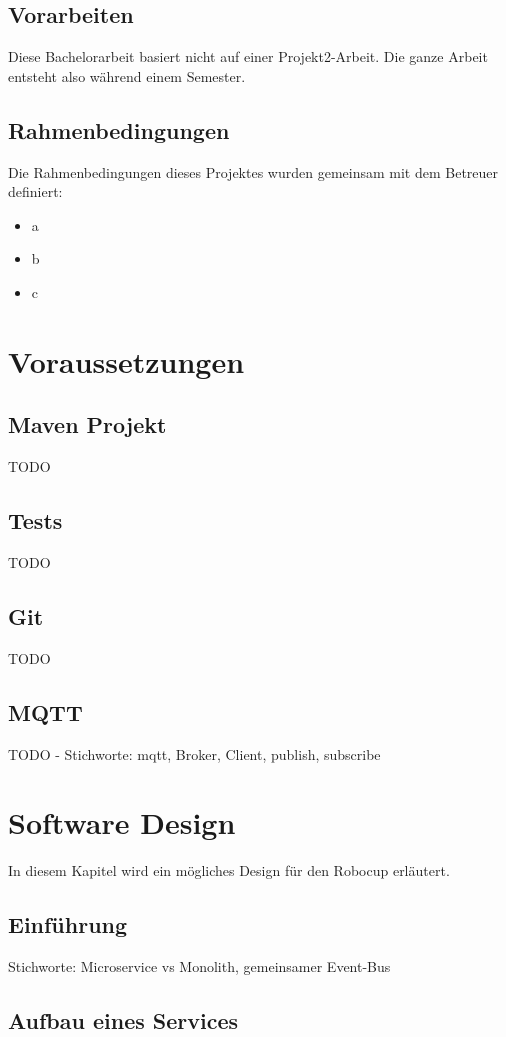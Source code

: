 \documentclass[11pt,english,german]{report}
\begin{document}
\section{Vorarbeiten}
Diese Bachelorarbeit basiert nicht auf einer Projekt2-Arbeit. Die ganze Arbeit entsteht also während einem Semester.

\section{Rahmenbedingungen}
Die Rahmenbedingungen dieses Projektes wurden gemeinsam mit dem Betreuer definiert:
\begin{itemize}
\item a
\item b
\item c
\end{itemize}


\chapter{Voraussetzungen}
\section{Maven Projekt}
TODO
\section{Tests}
TODO
\section{Git}
TODO
\section{MQTT}
TODO - Stichworte: \acrshort{mqtt}, Broker, Client, publish, subscribe

\chapter{Software Design}
In diesem Kapitel wird ein mögliches Design für den Robocup erläutert.
\section{Einführung}
Stichworte: Microservice vs Monolith, gemeinsamer Event-Bus
\section{Aufbau eines Services}
\end{document}

